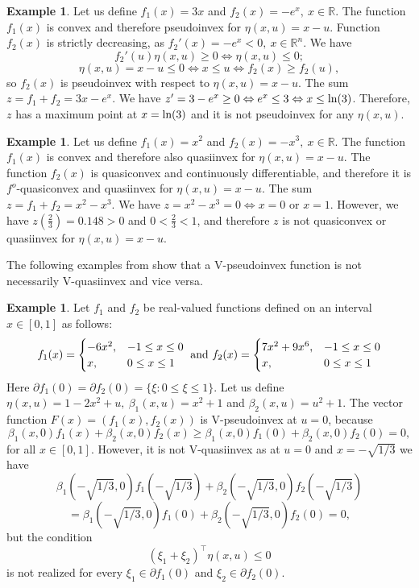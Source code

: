 \documentclass{article}
\theoremstyle{definition}
\newtheorem{example}[maar]{Example}
\begin{document}
\begin{example} Let us define $f_1(x) = 3x$ and $f_2(x) = -e^x,\ x \in \mathbb R$. The function $f_1(x)$ is convex and therefore pseudoinvex for $\eta(x,u) = x - u$. Function $f_2(x)$ is strictly decreasing, as $f_2'(x) = -e^x < 0,\ x \in \mathbb R^n$. We have $$f_2'(u)\eta(x,u) \geq 0 \Leftrightarrow \eta(x,u) \leq 0;$$ 
$$\eta(x,u) = x - u \leq 0 \Leftrightarrow x \leq u \Leftrightarrow f_2(x) \geq f_2(u),$$ so $f_2(x)$ is pseudoinvex with respect to $\eta(x,u) = x - u$. The sum $z = f_1 + f_2 = 3x - e^x$. We have $z' = 3 - e^x \geq 0 \Leftrightarrow e^x \leq 3 \Leftrightarrow x \leq \textnormal{ln}(3)$. Therefore, $z$ has a maximum point at $x = \textnormal{ln}(3)$ and it is not pseudoinvex for any $\eta(x,u)$.
\end{example}

\begin{example} Let us define $f_1(x) = x^2$ and $f_2(x) = -x^3,\ x \in \mathbb R$. The function $f_1(x)$ is convex and therefore also quasiinvex for $\eta(x,u) = x - u$. The function $f_2(x)$ is quasiconvex and continuously differentiable, and therefore it is $f^o$-quasiconvex and quasiinvex for $\eta(x,u) = x - u$. The sum $z = f_1 + f_2 = x^2 - x^3$. We have $z = x^2 - x^3 = 0 \Leftrightarrow x = 0$ or $x = 1$. However, we have $z(\frac{2}{3}) = 0.148 > 0$ and $0 < \frac{2}{3} < 1$, and therefore $z$ is not quasiconvex or quasiinvex for $\eta(x,u) = x - u$.
\end{example}

The following examples from \cite{BhaGar} show that a V-pseudoinvex function is not necessarily V-quasiinvex and vice versa.
\begin{example} Let $f_1$ and $f_2$ be real-valued functions defined on an interval $x \in [0,1]$ as follows:
$$f_1(x) = \begin{cases} -6x^2, & -1 \leq x \leq 0 \\
x, & 0 \leq x \leq 1
\end{cases}
\ \textnormal{and}\ 
f_2(x) = \begin{cases} 7x^2 + 9x^6, & -1 \leq x \leq 0 \\
x, & 0 \leq x \leq 1
\end{cases}$$
Here $\partial f_1(0) = \partial f_2(0) = \{\xi : 0 \leq \xi \leq 1\}$. Let us define $\eta(x,u) = 1 - 2x^2 + u,\ \beta_1(x,u) = x^2 + 1$ and $\beta_2(x,u) = u^2 + 1$. The vector function $F(x) = (f_1(x),f_2(x))$ is V-pseudoinvex at $u=0$, because 
$$\beta_1(x,0)f_1(x) + \beta_2(x,0)f_2(x) \geq \beta_1(x,0)f_1(0) + \beta_2(x,0)f_2(0) = 0,$$
for all $x \in [0,1]$. However, it is not V-quasiinvex as at $u = 0$ and $x = -\sqrt{1/3}$ we have 
$$\beta_1(-\sqrt{1/3},0)f_1(-\sqrt{1/3}) + \beta_2(-\sqrt{1/3},0)f_2(-\sqrt{1/3})$$
$$= \beta_1(-\sqrt{1/3},0)f_1(0) + \beta_2(-\sqrt{1/3},0)f_2(0) = 0,$$
but the condition
$$(\xi_1 + \xi_2)^\top\eta(x,u) \leq 0$$
is not realized for every $\xi_1 \in \partial f_1(0)$ and $\xi_2 \in \partial f_2(0)$.
\end{example}
\end{document}
